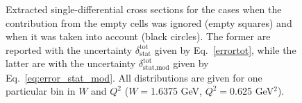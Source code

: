 \begin{figure}[htp]
\begin{center}
\caption{\small Extracted single-differential cross sections for the cases when the contribution from the empty cells was ignored (empty squares) and when it was taken into account (black circles). The former are reported with the uncertainty $\delta_{\text{stat}}^{\text{tot}}$ given by Eq.~\eqref{errortot}, while the latter are with the uncertainty $\delta_{\text{stat,mod}}^{\text{tot}}$ given by Eq.~\eqref{eq:error_stat_mod}. All distributions are given for one particular bin in $W$ and $Q^2$ ($W = $1.6375 GeV, $Q^2 = $0.625 GeV$^2$).} \label{fig:empt_corr}
\end{center}
\end{figure}

